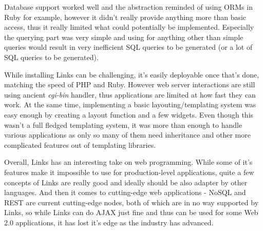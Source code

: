 Database support worked well and the abstraction reminded of using ORMs in Ruby for example, however it didn't really provide anything more than basic access, thus it really limited what could potentially be implemented. Especially the querying part was very simple and using for anything other than simple queries would result in very inefficient SQL queries to be generated (or a lot of SQL queries to be generated). 

While installing Links can be challenging, it's easily deployable once that's done, matching the speed of PHP and Ruby. However web server interactions are still using ancient \textit{cgi-bin} handler, thus applications are limited at how fast they can work. At the same time, implementing a basic layouting/templating system was easy enough by creating a layout function and a few widgets. Even though this wasn't a full fledged templating system, it was more than enough to handle various applications as only so many of them need inheritance and other more complicated features out of templating libraries.

Overall, Links has an interesting take on web programming. While some of it's features make it impossible to use for production-level applications, quite a few concepts of Links are really good and ideally should be also adapter by other languages. And then it comes to cutting-edge web applications - NoSQL and REST are current cutting-edge nodes, both of which are in no way supported by Links, so while Links can do AJAX just fine and thus can be used for some Web 2.0 applications, it has lost it's edge as the industry has advanced.